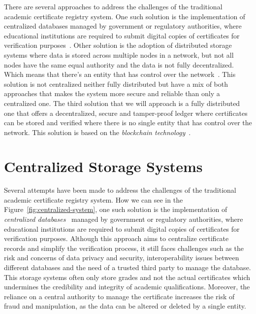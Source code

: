 There are several approaches to address the challenges of the traditional academic certificate registry system. One such solution is the implementation of centralized databases managed by government or regulatory authorities,
where educational institutions are required to submit digital copies of certificates for verification purposes~\cite{LinWays}.
Other solution is the adoption of distributed storage systems where data is stored across multiple nodes in a network, but not all nodes have the same equal authority and the data is not fully decentralized. Which means that there's an entity that has control over the network~\cite{sharples2016blockchain}.
This solution is not centralized neither fully distributed but have a mix of both approaches that makes the system more secure and reliable than only a centralized one.
The third solution that we will approach is a fully distributed one that offers a decentralized, secure and tamper-proof ledger where certificates can be stored and verified where
there is no single entity that has control over the network. This solution is based on the \textit{blockchain technology}~\cite{app14020706, saleh2020blockchain}.

\section{Centralized Storage Systems}\label{subsec:centralized-systems}
\paragraph{}

Several attempts have been made to address the challenges of the traditional academic certificate registry system.
How we can see in the Figure~\ref{fig:centralized-system}, one such solution is the implementation of \textit{centralized databases}~\cite{OLSON200971} managed by government or regulatory authorities, where educational institutions are required to
submit digital copies of certificates for verification purposes. Although this approach aims to centralize certificate records and simplify the verification process, it still faces challenges
such as the risk and concerns of data privacy and security, interoperability issues between different databases and the need of a trusted third party to manage the database.
This storage systems often only store grades and not the actual certificates which undermines the credibility and integrity of academic qualifications.
Moreover, the reliance on a central authority to manage the certificate increases the risk of fraud and manipulation, as the data can be altered or deleted by a single entity.

